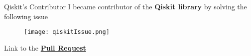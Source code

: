 		\begin{frame}{Qiskit's Contributor}
			\small
			I became contributor of the \textbf{Qiskit library} by solving the following issue
			\begin{figure}[h]
				\centering
				\texttt{[image: qiskitIssue.png]}
			\end{figure}
			Link to the \href{https://github.com/Qiskit/qiskit-terra/pull/3751}{\textbf{Pull Request}}
		\end{frame}
		